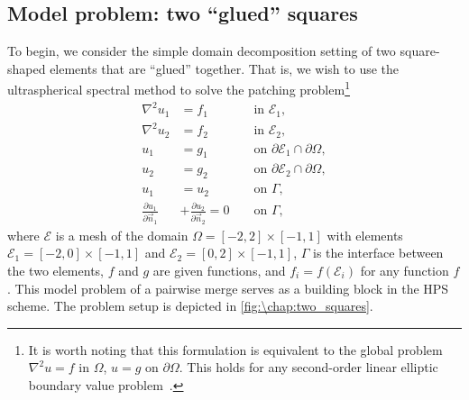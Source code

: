 \subsection{Model problem: two ``glued'' squares}\label{sec:\chap:ultra_dd}
To begin, we consider the simple domain decomposition setting of two square-shaped elements that are ``glued'' together. That is, we wish to use the ultraspherical spectral method to solve the patching problem\footnote{It is worth noting that this formulation is equivalent to the global problem $\nabla^2 u = f$ in $\Omega$, $u=g$ on $\partial\Omega$. This holds for any second-order linear elliptic boundary value problem~\cite{Canuto_07_01}.}
\begin{equation}\label{eq:\chap:model}
\begin{aligned}
\nabla^2 u_1 &= f_1 && \text{ in } \mathcal{E}_1, \\
\nabla^2 u_2 &= f_2 && \text{ in } \mathcal{E}_2, \\
u_1 &= g_1 && \text{ on } \partial\mathcal{E}_1 \cap \partial\Omega, \\
u_2 &= g_2 && \text{ on } \partial\mathcal{E}_2 \cap \partial\Omega, \\
u_1 &= u_2 && \text{ on } \Gamma, \\
\tfrac{\partial u_1}{\partial \vec{n}_1} &+ \tfrac{\partial u_2}{\partial \vec{n}_2} = 0 && \text{ on } \Gamma,
\end{aligned}
\end{equation}
where $\mathcal{E}$ is a mesh of the domain $\Omega = [-2, 2] \times [-1, 1]$ with elements $\mathcal{E}_1 = [-2, 0] \times [-1, 1]$ and $\mathcal{E}_2 = [0, 2] \times [-1, 1]$, $\Gamma$ is the interface between the two elements, $f$ and $g$ are given functions, and $f_i = f(\mathcal{E}_i)$ for any function $f$. This model problem of a pairwise merge serves as a building block in the HPS scheme. The problem setup is depicted in \cref{fig:\chap:two_squares}.

